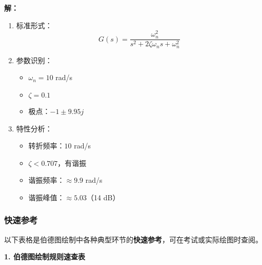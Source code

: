 \begin{tcolorbox}[colback=blue!5!white,colframe=blue!75!black,title=例3求解过程与伯德图]

\begin{minipage}[t]{0.47\textwidth}
\textbf{解：}
\begin{enumerate}
    \item 标准形式：
    $$G(s) = \frac{\omega_n^2}{s^2 + 2\zeta\omega_n s + \omega_n^2}$$
    
    \item 参数识别：
    \begin{itemize}
        \item $\omega_n = 10$ rad/s
        \item $\zeta = 0.1$
        \item 极点：$-1 \pm 9.95j$
    \end{itemize}
    
    \item 特性分析：
    \begin{itemize}
        \item 转折频率：$10$ rad/s
        \item $\zeta < 0.707$，有谐振
        \item 谐振频率：$\approx 9.9$ rad/s
        \item 谐振峰值：$\approx 5.03$（14 dB）
    \end{itemize}
\end{enumerate}
\end{minipage}\hfill
\begin{minipage}[t]{0.47\textwidth}
\end{minipage}

\end{tcolorbox}

\subsubsection{快速参考}

以下表格是伯德图绘制中各种典型环节的\textbf{快速参考}，可在考试或实际绘图时查阅。

\textbf{1. 伯德图绘制规则速查表}

